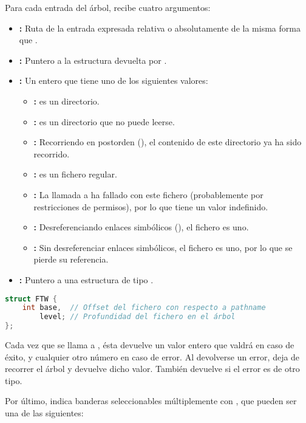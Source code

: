 Para cada entrada del árbol,  recibe cuatro argumentos:

\begin{itemize}
	\item{}\textbf{:} Ruta de la entrada expresada relativa o absolutamente de la misma forma que .
	\item{}\textbf{:} Puntero a la estructura  devuelta por .
	\item{}\textbf{:} Un entero que tiene uno de los siguientes valores:
	\begin{itemize}
		\item{}\textbf{:}  es un directorio.
		\item{}\textbf{:}  es un directorio que no puede leerse.
		\item{}\textbf{:} Recorriendo en postorden (), el contenido de este directorio ya ha sido recorrido.
		\item{}\textbf{:}  es un fichero regular.
		\item{}\textbf{:} La llamada a  ha fallado con este fichero (probablemente por restricciones de permisos), por lo que  tiene un valor indefinido.
		\item{}\textbf{:} Desreferenciando enlaces simbólicos (), el fichero es uno.
		\item{}\textbf{:} Sin desreferenciar enlaces simbólicos, el fichero es uno, por lo que se pierde su referencia.
	\end{itemize}
	\item{}\textbf{:} Puntero a una estructura de tipo .
\end{itemize}

\begin{lstlisting}[language=C]
struct FTW {
	int base,  // Offset del fichero con respecto a pathname
	    level; // Profundidad del fichero en el árbol
};
\end{lstlisting}

Cada vez que se llama a , ésta devuelve un valor entero que valdrá  en caso de éxito, y cualquier otro número en caso de error.
Al devolverse un error,  deja de recorrer el árbol y devuelve dicho valor.
También devuelve  si el error es de otro tipo.

Por último,  indica banderas seleccionables múltiplemente con , que pueden ser una de las siguientes:

